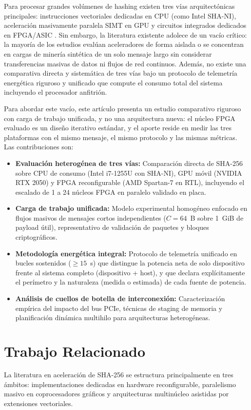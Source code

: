 \documentclass[conference]{IEEEtran}
\begin{document}
Para procesar grandes volúmenes de hashing existen tres vías arquitectónicas principales: instrucciones vectoriales dedicadas en CPU (como Intel SHA-NI), aceleración masivamente paralela SIMT en GPU y circuitos integrados dedicados en FPGA/ASIC \cite{martino2020}. Sin embargo, la literatura existente adolece de un vacío crítico: la mayoría de los estudios evalúan aceleradores de forma aislada o se concentran en cargas de minería sintética de un solo mensaje largo sin considerar transferencias masivas de datos ni flujos de red continuos. Además, no existe una comparativa directa y sistemática de tres vías bajo un protocolo de telemetría energética riguroso y unificado que compute el consumo total del sistema incluyendo el procesador anfitrión.

Para abordar este vacío, este artículo presenta un estudio comparativo riguroso con carga de trabajo unificada, y no una arquitectura nueva: el núcleo FPGA evaluado es un diseño iterativo estándar, y el aporte reside en medir las tres plataformas con el mismo mensaje, el mismo protocolo y las mismas métricas. Las contribuciones son:
\begin{itemize}
    \item \textbf{Evaluación heterogénea de tres vías:} Comparación directa de SHA-256 sobre CPU de consumo (Intel i7-1255U con SHA-NI), GPU móvil (NVIDIA RTX 2050) y FPGA reconfigurable (AMD Spartan-7 en RTL), incluyendo el escalado de 1 a 24 núcleos FPGA en paralelo validado en placa.
    \item \textbf{Carga de trabajo unificada:} Modelo experimental homogéneo enfocado en flujos masivos de mensajes cortos independientes ($C = 64$~B sobre 1~GiB de payload útil), representativo de validación de paquetes y bloques criptográficos.
    \item \textbf{Metodología energética integral:} Protocolo de telemetría unificado en bucles sostenidos ($\geq 15$~s) que distingue la potencia neta de solo dispositivo frente al sistema completo (dispositivo + host), y que declara explícitamente el perímetro y la naturaleza (medida o estimada) de cada fuente de potencia.
    \item \textbf{Análisis de cuellos de botella de interconexión:} Caracterización empírica del impacto del bus PCIe, técnicas de staging de memoria y planificación dinámica multihilo para arquitecturas heterogéneas.
\end{itemize}

\section{Trabajo Relacionado}
La literatura en aceleración de SHA-256 se estructura principalmente en tres ámbitos: implementaciones dedicadas en hardware reconfigurable, paralelismo masivo en coprocesadores gráficos y arquitecturas multinúcleo asistidas por extensiones vectoriales.
\end{document}
